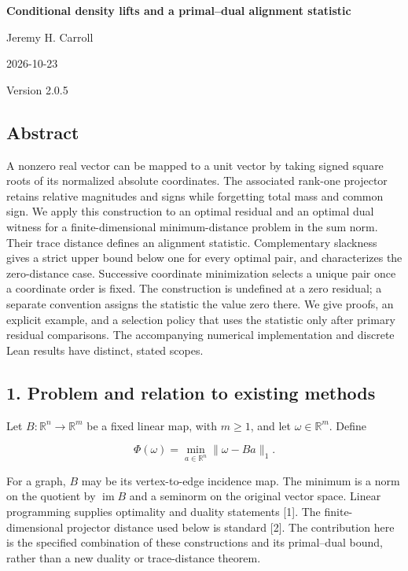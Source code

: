 \documentclass[
]{article}
\author{}
\date{}
\begin{document}
\begin{center}
{\LARGE\bfseries Conditional density lifts and a primal–dual alignment statistic\par}
Jeremy H. Carroll\par
2026-10-23\par
Version 2.0.5\par
\end{center}

\subsection{Abstract}\label{abstract}

A nonzero real vector can be mapped to a unit vector by taking signed
square roots of its normalized absolute coordinates. The associated
rank-one projector retains relative magnitudes and signs while
forgetting total mass and common sign. We apply this construction to an
optimal residual and an optimal dual witness for a finite-dimensional
minimum-distance problem in the sum norm. Their trace distance defines
an alignment statistic. Complementary slackness gives a strict upper
bound below one for every optimal pair, and characterizes the
zero-distance case. Successive coordinate minimization selects a unique
pair once a coordinate order is fixed. The construction is undefined at
a zero residual; a separate convention assigns the statistic the value
zero there. We give proofs, an explicit example, and a selection policy
that uses the statistic only after primary residual comparisons. The
accompanying numerical implementation and discrete Lean results have
distinct, stated scopes.

\subsection{1. Problem and relation to existing
methods}\label{problem-and-relation-to-existing-methods}

Let \(B:\mathbb R^n\to\mathbb R^m\) be a fixed linear map, with
\(m\ge1\), and let \(\omega\in\mathbb R^m\). Define

\[
\Phi(\omega)=\min_{a\in\mathbb R^n}\|\omega-Ba\|_1.
\]

For a graph, \(B\) may be its vertex-to-edge incidence map. The minimum
is a norm on the quotient by \(\operatorname{im}B\) and a seminorm on
the original vector space. Linear programming supplies optimality and
duality statements {[}1{]}. The finite-dimensional projector distance
used below is standard {[}2{]}. The contribution here is the specified
combination of these constructions and its primal--dual bound, rather
than a new duality or trace-distance theorem.
\end{document}
